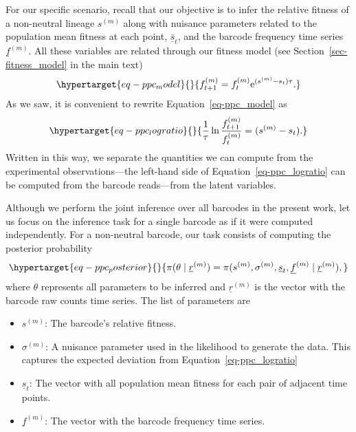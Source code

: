 \documentclass[
]{scrartcl}
\providecommand{\tightlist}{%
  \setlength{\itemsep}{0pt}\setlength{\parskip}{0pt}}\usepackage{longtable,booktabs,array}
\begin{document}
\begin{refsegment}
For our specific scenario, recall that our objective is to infer the
relative fitness of a non-neutral lineage \(s^{(m)}\) along with
nuisance parameters related to the population mean fitness at each
point, \(\underline{\bar{s}}_t\), and the barcode frequency time series
\(\underline{f}^{(m)}\). All these variables are related through our
fitness model (see Section~\ref{sec-fitness_model} in the main text)
\begin{equation}\protect\hypertarget{eq-ppc_model}{}{
f_{t+1}^{(m)} = f_{t}^{(m)} \mathrm{e}^{(s^{(m)} - s_t)\tau}.
}\label{eq-ppc_model}\end{equation} As we saw, it is convenient to
rewrite Equation~\ref{eq-ppc_model} as
\begin{equation}\protect\hypertarget{eq-ppc_logratio}{}{
\frac{1}{\tau}\ln\frac{f_{t+1}^{(m)}}{f_{t}^{(m)}} = (s^{(m)} - s_t).
}\label{eq-ppc_logratio}\end{equation} Written in this way, we separate
the quantities we can compute from the experimental observations---the
left-hand side of Equation~\ref{eq-ppc_logratio} can be computed from
the barcode reads---from the latent variables.

Although we perform the joint inference over all barcodes in the present
work, let us focus on the inference task for a single barcode as if it
were computed independently. For a non-neutral barcode, our task
consists of computing the posterior probability
\begin{equation}\protect\hypertarget{eq-ppc_posterior}{}{
\pi(\theta \mid \underline{r}^{(m)}) =
\pi(
    s^{(m)}, \sigma^{(m)}, \underline{s}_t, \underline{f}^{(m)}
    \mid \underline{r}^{(m)}
),
}\label{eq-ppc_posterior}\end{equation} where \(\theta\) represents all
parameters to be inferred and \(\underline{r}^{(m)}\) is the vector with
the barcode raw counts time series. The list of parameters are

\begin{itemize}
\tightlist
\item
  \(s^{(m)}\): The barcode's relative fitness.
\item
  \(\sigma^{(m)}\): A nuisance parameter used in the likelihood to
  generate the data. This captures the expected deviation from
  Equation~\ref{eq-ppc_logratio}
\item
  \(\underline{s}_t\): The vector with all population mean fitness for
  each pair of adjacent time points.
\item
  \(\underline{f}^{(m)}\): The vector with the barcode frequency time
  series.
\end{itemize}


\end{refsegment}
\end{document}
